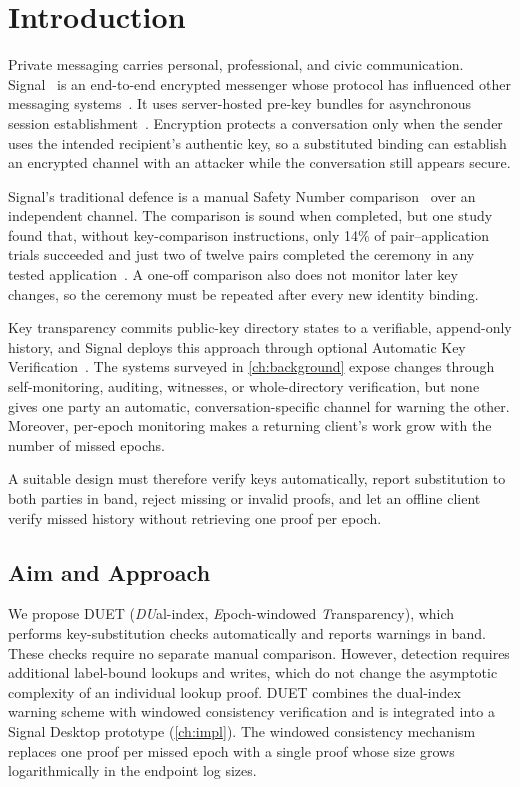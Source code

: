 \chapter{Introduction}\label{ch:intro}

Private messaging carries personal, professional, and civic communication. Signal~\cite{signal-home}
is an end-to-end encrypted messenger whose protocol has influenced other messaging
systems~\cite{signal-protocol-impact}. It uses server-hosted pre-key bundles for asynchronous
session establishment~\cite[Sections~3.1--3.3]{x3dh}. Encryption protects a conversation only when the sender uses the
intended recipient's authentic key, so a substituted binding can establish an encrypted channel with
an attacker while the conversation still appears secure.

Signal's traditional defence is a manual Safety Number comparison~\cite{safetynumbers} over an independent channel. The
comparison is sound when completed, but one study found that, without key-comparison
instructions, only 14\% of pair--application trials succeeded and just two of twelve pairs
completed the ceremony in any tested application~\cite{vaziripour2017}. A one-off comparison also does not monitor later key
changes, so the ceremony must be repeated after every new identity binding.

Key transparency commits public-key directory states to a verifiable, append-only history, and Signal
deploys this approach through optional Automatic Key Verification~\cite{signal-akv}. The systems
surveyed in \cref{ch:background} expose changes through self-monitoring, auditing, witnesses, or
whole-directory verification, but none gives one party an automatic, conversation-specific channel for
warning the other. Moreover, per-epoch monitoring makes a returning client's work grow with the number of
missed epochs.

A suitable design must therefore verify keys automatically, report substitution to both parties in
band, reject missing or invalid proofs, and let an offline client verify missed history without
retrieving one proof per epoch.

\section{Aim and Approach}\label{sec:intro-aims}

We propose DUET (\emph{DU}al-index, \emph{E}poch-windowed \emph{T}ransparency), which performs
key-substitution checks automatically and reports warnings in band. These checks require no separate
manual comparison. However, detection requires additional label-bound lookups and writes, which do
not change the asymptotic complexity of an individual lookup proof. DUET combines the dual-index
warning scheme with windowed consistency verification and is integrated into a Signal Desktop
prototype (\cref{ch:impl}). The windowed consistency mechanism replaces one proof per missed epoch
with a single proof whose size grows logarithmically in the endpoint log sizes.

